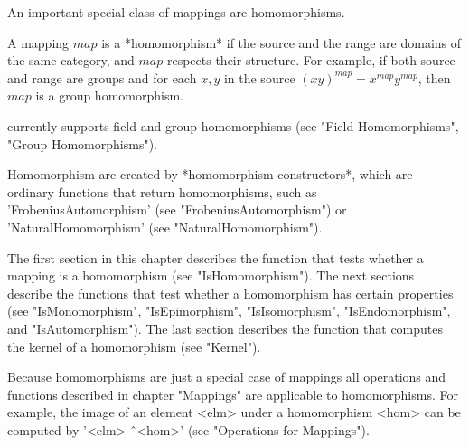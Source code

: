
An important special class of mappings are homomorphisms.

A mapping $map$  is  a  *homomorphism*  if  the  source and the range are
domains of the same  category, and $map$  respects their structure.   For
example, if both source and range  are groups and  for each $x,y$  in the
source  $(xy)^{map}   =  x^{map}   y^{map}$,  then   $map$  is  a   group
homomorphism.

{\GAP}  currently  supports  field and  group homomorphisms  (see  "Field
Homomorphisms", "Group Homomorphisms").

Homomorphism  are  created  by  *homomorphism  constructors*,  which  are
ordinary  {\GAP}   functions   that   return   homomorphisms,   such   as
'FrobeniusAutomorphism'      (see       "FrobeniusAutomorphism")       or
'NaturalHomomorphism' (see "NaturalHomomorphism").

The first section in  this  chapter  describes  the  function  that tests
whether  a  mapping is a  homomorphism (see "IsHomomorphism").   The next
sections  describe  the  functions that  test  whether a homomorphism has
certain     properties     (see     "IsMonomorphism",    "IsEpimorphism",
"IsIsomorphism",  "IsEndomorphism",  and  "IsAutomorphism").   The   last
section describes the function that computes the kernel of a homomorphism
(see "Kernel").

Because homomorphisms  are just a special case of mappings all operations
and   functions  described  in  chapter  "Mappings"  are   applicable  to
homomorphisms.   For  example, the image  of  an  element <elm>  under  a
homomorphism  <hom> can be computed by '<elm> \^\ <hom>' (see "Operations
for Mappings").

